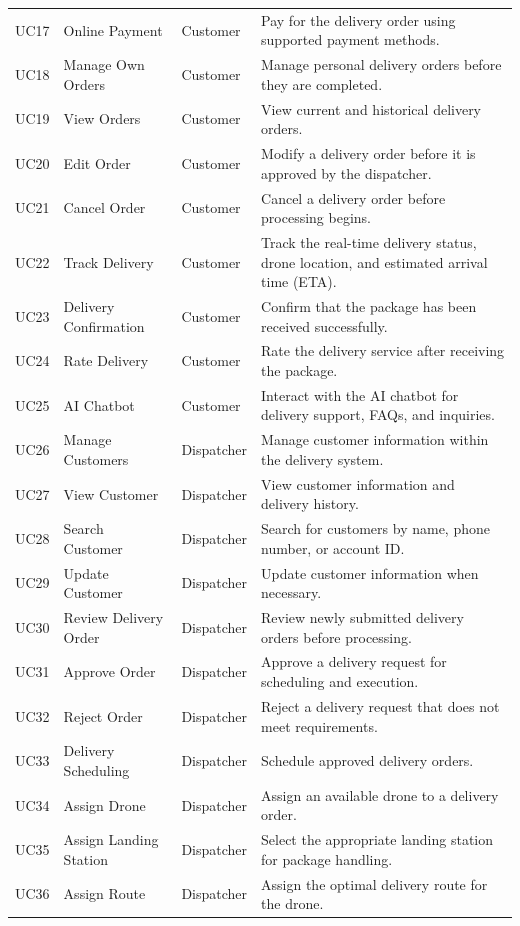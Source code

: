 \begin{longtable}{@{}p{1.3cm}p{3cm}p{2.7cm}p{6.5cm}@{}}
UC17 & Online Payment & Customer & Pay for the delivery order using supported payment methods. \\
UC18 & Manage Own Orders & Customer & Manage personal delivery orders before they are completed. \\
UC19 & View Orders & Customer & View current and historical delivery orders. \\
UC20 & Edit Order & Customer & Modify a delivery order before it is approved by the dispatcher. \\
UC21 & Cancel Order & Customer & Cancel a delivery order before processing begins. \\
UC22 & Track Delivery & Customer & Track the real-time delivery status, drone location, and estimated arrival time (ETA). \\
UC23 & Delivery Confirmation & Customer & Confirm that the package has been received successfully. \\
UC24 & Rate Delivery & Customer & Rate the delivery service after receiving the package. \\
UC25 & AI Chatbot & Customer & Interact with the AI chatbot for delivery support, FAQs, and inquiries. \\
UC26 & Manage Customers & Dispatcher & Manage customer information within the delivery system. \\
UC27 & View Customer & Dispatcher & View customer information and delivery history. \\
UC28 & Search Customer & Dispatcher & Search for customers by name, phone number, or account ID. \\
UC29 & Update Customer & Dispatcher & Update customer information when necessary. \\
UC30 & Review Delivery Order & Dispatcher & Review newly submitted delivery orders before processing. \\
UC31 & Approve Order & Dispatcher & Approve a delivery request for scheduling and execution. \\
UC32 & Reject Order & Dispatcher & Reject a delivery request that does not meet requirements. \\
UC33 & Delivery Scheduling & Dispatcher & Schedule approved delivery orders. \\
UC34 & Assign Drone & Dispatcher & Assign an available drone to a delivery order. \\
UC35 & Assign Landing Station & Dispatcher & Select the appropriate landing station for package handling. \\
UC36 & Assign Route & Dispatcher & Assign the optimal delivery route for the drone. \\

\end{longtable}
